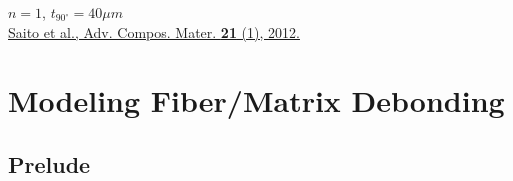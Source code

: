 \documentclass[first,firstsupp,lastsupp,last,hyperref,table]{ETHclass}
\begin{document}
\begin{frame}
\begin{figure}
\end{figure}
\vspace{-0.25cm}
$n=1$, $t_{90^{\circ}}=40\mu m$\\\vspace{5pt}
\pgfmathsetmacro{}
\pgfmathsetmacro{}
{\fontsize{\fontsizeref}{\stretchref} \selectfont \href{https://doi.org/10.1163/156855112X629522}{Saito et al., Adv. Compos. Mater. \textbf{21} (1), 2012.}}
\end{frame}

\section{Modeling Fiber/Matrix Debonding}

\subsection{Prelude}
\end{document}
